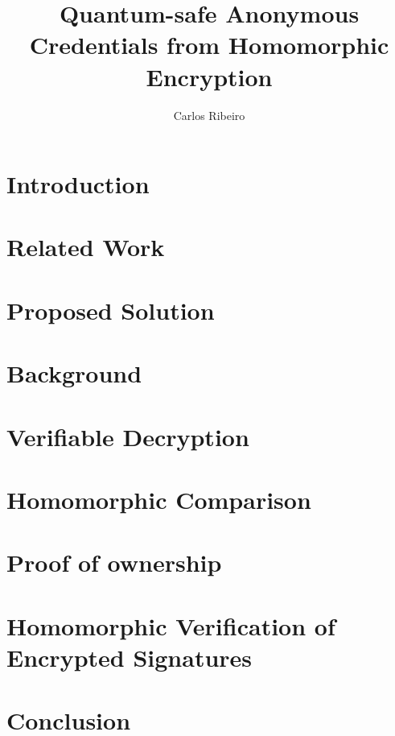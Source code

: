 \documentclass[sigconf,anonymous,review]{acmart}
\begin{document}
\title{Quantum-safe Anonymous Credentials from Homomorphic Encryption}

\author{Carlos Ribeiro}



\begin{abstract}

\end{abstract}

\maketitle

\section{Introduction}


\section{Related Work}


\section{Proposed Solution}\label{sec:solution}


\section{Background}


\section{Verifiable Decryption}\label{sec:otk}


\section{Homomorphic Comparison}\label{sec:comparison}


\section{Proof of ownership}\label{sec:owner}


\section{Homomorphic Verification of Encrypted Signatures}\label{sec:sig}


\section{Conclusion}


%

%
 

\appendix


\end{document}
